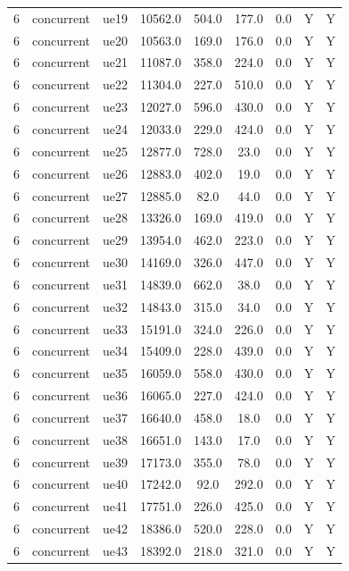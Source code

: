 \begin{table}[ht]
\begin{tabular}{|c|c|c|c|c|c|c|c|c|}
6 & concurrent & ue19 & 10562.0 & 504.0 & 177.0 & 0.0 & Y & Y \\
6 & concurrent & ue20 & 10563.0 & 169.0 & 176.0 & 0.0 & Y & Y \\
6 & concurrent & ue21 & 11087.0 & 358.0 & 224.0 & 0.0 & Y & Y \\
6 & concurrent & ue22 & 11304.0 & 227.0 & 510.0 & 0.0 & Y & Y \\
6 & concurrent & ue23 & 12027.0 & 596.0 & 430.0 & 0.0 & Y & Y \\
6 & concurrent & ue24 & 12033.0 & 229.0 & 424.0 & 0.0 & Y & Y \\
6 & concurrent & ue25 & 12877.0 & 728.0 & 23.0 & 0.0 & Y & Y \\
6 & concurrent & ue26 & 12883.0 & 402.0 & 19.0 & 0.0 & Y & Y \\
6 & concurrent & ue27 & 12885.0 & 82.0 & 44.0 & 0.0 & Y & Y \\
6 & concurrent & ue28 & 13326.0 & 169.0 & 419.0 & 0.0 & Y & Y \\
6 & concurrent & ue29 & 13954.0 & 462.0 & 223.0 & 0.0 & Y & Y \\
6 & concurrent & ue30 & 14169.0 & 326.0 & 447.0 & 0.0 & Y & Y \\
6 & concurrent & ue31 & 14839.0 & 662.0 & 38.0 & 0.0 & Y & Y \\
6 & concurrent & ue32 & 14843.0 & 315.0 & 34.0 & 0.0 & Y & Y \\
6 & concurrent & ue33 & 15191.0 & 324.0 & 226.0 & 0.0 & Y & Y \\
6 & concurrent & ue34 & 15409.0 & 228.0 & 439.0 & 0.0 & Y & Y \\
6 & concurrent & ue35 & 16059.0 & 558.0 & 430.0 & 0.0 & Y & Y \\
6 & concurrent & ue36 & 16065.0 & 227.0 & 424.0 & 0.0 & Y & Y \\
6 & concurrent & ue37 & 16640.0 & 458.0 & 18.0 & 0.0 & Y & Y \\
6 & concurrent & ue38 & 16651.0 & 143.0 & 17.0 & 0.0 & Y & Y \\
6 & concurrent & ue39 & 17173.0 & 355.0 & 78.0 & 0.0 & Y & Y \\
6 & concurrent & ue40 & 17242.0 & 92.0 & 292.0 & 0.0 & Y & Y \\
6 & concurrent & ue41 & 17751.0 & 226.0 & 425.0 & 0.0 & Y & Y \\
6 & concurrent & ue42 & 18386.0 & 520.0 & 228.0 & 0.0 & Y & Y \\
6 & concurrent & ue43 & 18392.0 & 218.0 & 321.0 & 0.0 & Y & Y \\

\end{tabular}
\end{table}
